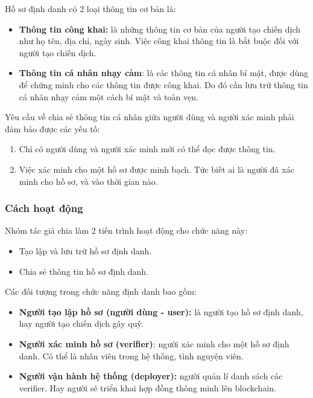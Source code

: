 \documentclass[../main-report.tex]{subfiles}
\begin{document}
Hồ sơ định danh có 2 loại thông tin cơ bản là: 

\begin{itemize}
\item \textbf{Thông tin công khai:} là những thông tin cơ bản của người tạo chiến dịch như họ tên, địa chỉ, ngày sinh. Việc công khai thông tin là bắt buộc đối với người tạo chiến dịch.
\item \textbf{Thông tin cá nhân nhạy cảm}: là các thông tin cá nhân bí mật, được dùng để chứng minh cho các thông tin được công khai. Do đó cần lưu trữ thông tin cá nhân nhạy cảm một cách bí mật và toàn vẹn.
\end{itemize}

Yêu cầu về chia sẻ thông tin cá nhân giữa người dùng và người xác minh phải đảm bảo được các yếu tố:

\begin{enumerate}
\item Chỉ có người dùng và người xác minh mới có thể đọc được thông tin.
\item Việc xác minh cho một hồ sơ được minh bạch. Tức biết ai là người đã xác minh cho hồ sơ, và vào thời gian nào.
\end{enumerate}

\subsubsection{Cách hoạt động}
Nhóm tác giả chia làm 2 tiến trình hoạt động cho chức năng này:

\begin{itemize}
\item Tạo lập và lưu trữ hồ sơ định danh.
\item Chia sẻ thông tin hồ sơ định danh.
\end{itemize}

Các đối tượng trong chức năng định danh bao gồm:

\begin{itemize}
\item \textbf{Người tạo lập hồ sơ (người dùng - user):} là người tạo hồ sơ định danh, hay người tạo chiến dịch gây quỹ.
\item \textbf{Người xác minh hồ sơ (verifier)}: người xác minh cho một hồ sơ định danh. Có thể là nhân viên trong hệ thống, tình nguyện viên.
\item \textbf{Người vận hành hệ thống (deployer):} người quản lí danh sách các verifier. Hay người sẽ triển khai hợp đồng thông minh lên \gls{blockchain}.
\end{itemize}
\end{document}
